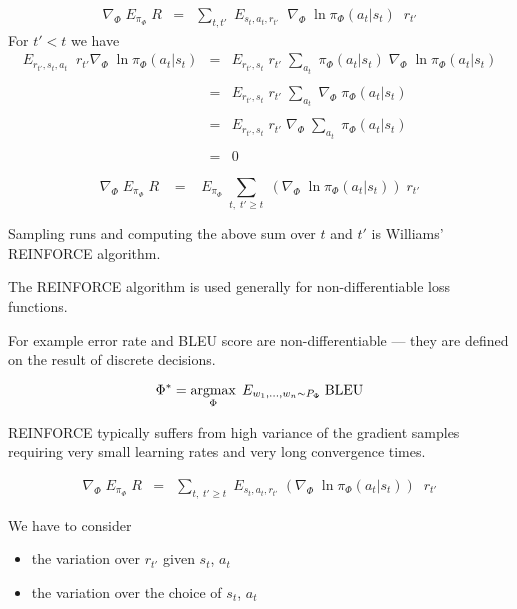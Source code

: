 {

\begin{eqnarray*}
    \nabla_\Phi \; E_{\pi_\Phi}\; R  & = & \sum_{t,t'}\;E_{s_t,a_t,r_{t'}}\;\; \nabla_\Phi\;\ln \pi_\Phi(a_{t}|s_{t})\;\;r_{t'}
    \end{eqnarray*}
For $t' < t$ we have
{\huge
\begin{eqnarray*}
    E_{r_{t'},s_t,a_t}\;\; r_{t'} \nabla_\Phi\;\ln \pi_\Phi(a_t|s_t)  & =  & E_{r_{t'},s_t}\; r_{t'}  \;\sum_{a_t} \; \pi_\Phi(a_t|s_t)\; \nabla_\Phi\;\ln \pi_\Phi(a_t|s_t) \\
    \\
    & =  & E_{r_{t'},s_t}\; r_{t'}  \;\sum_{a_t}\; \nabla_\Phi\; \pi_\Phi(a_t|s_t) \\
    \\
    & =  & E_{r_{t'},s_t}\; r_{t'}  \;\nabla_\Phi\; \sum_{a_t}\;\pi_\Phi(a_t|s_t) \\
    \\
    & = & 0
\end{eqnarray*}
}

$$\nabla_\Phi \;E_{\pi_\Phi}\;R \;\;\; = \;\;\; E_{\pi_\Phi}\; \sum_{t,\;t' \geq t} \; \left(\nabla_\Phi\;\ln \pi_\Phi(a_t|s_t)\right) \;r_{t'}$$

\vfill
Sampling runs and computing the above sum over $t$ and $t'$ is Williams' REINFORCE algorithm.


The REINFORCE algorithm is used generally for non-differentiable loss functions.

\vfill
For example error rate and BLEU score are non-differentiable --- they are defined on the result of discrete decisions.

\vfill
$$\Phi^* = \operatorname*{argmax}_\Phi \;E_{w_1,\ldots,w_n \sim P_\Phi}\;\mathrm{BLEU}$$


REINFORCE typically suffers from high variance of the gradient samples requiring very small learning rates and very long convergence times.

\begin{eqnarray*}
    \nabla_\Phi \; E_{\pi_\Phi}\; R  & = & \sum_{t,\;t'\geq t}\; E_{s_t,a_t,r_{t'}}\; \left(\nabla_\Phi\;\ln \pi_\Phi(a_{t}|s_{t})\right)\;\;r_{t'}
\end{eqnarray*}

\vfill
We have to consider
\begin{itemize}
\item {\color{red} the variation over $r_{t'}$ given $s_t$, $a_t$}
\item {\color{red} the variation over the choice of $s_t$, $a_t$}
\end{itemize}

}
